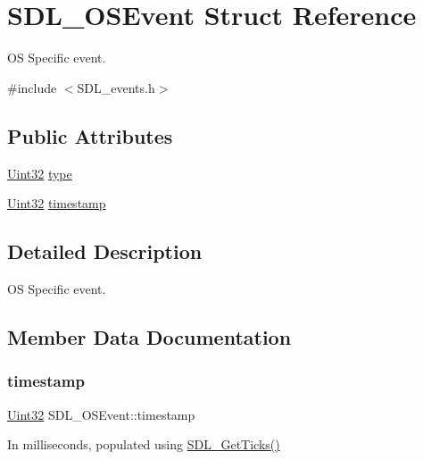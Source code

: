 \hypertarget{struct_s_d_l___o_s_event}{}\section{S\+D\+L\+\_\+\+O\+S\+Event Struct Reference}
\label{struct_s_d_l___o_s_event}


OS Specific event.  




{\ttfamily \#include $<$S\+D\+L\+\_\+events.\+h$>$}

\subsection*{Public Attributes}
\begin{DoxyCompactItemize}
\item 
\mbox{\hyperlink{_s_d_l__stdinc_8h_add440eff171ea5f55cb00c4a9ab8672d}{Uint32}} \mbox{\hyperlink{struct_s_d_l___o_s_event_a85a600619ebebc8db007fc757b3895a5}{type}}
\item 
\mbox{\hyperlink{_s_d_l__stdinc_8h_add440eff171ea5f55cb00c4a9ab8672d}{Uint32}} \mbox{\hyperlink{struct_s_d_l___o_s_event_a8b2480eefadad9f3f8c94f8e550b7fb0}{timestamp}}
\end{DoxyCompactItemize}


\subsection{Detailed Description}
OS Specific event. 

\subsection{Member Data Documentation}
\mbox{\label{struct_s_d_l___o_s_event_a8b2480eefadad9f3f8c94f8e550b7fb0}} 
\subsubsection{\texorpdfstring{timestamp}{timestamp}}
{\footnotesize\ttfamily \mbox{\hyperlink{_s_d_l__stdinc_8h_add440eff171ea5f55cb00c4a9ab8672d}{Uint32}} S\+D\+L\+\_\+\+O\+S\+Event\+::timestamp}

In milliseconds, populated using \mbox{\hyperlink{_s_d_l__timer_8h_a0b9bc71d6287e0ffafdc3419760fe2b3}{S\+D\+L\+\_\+\+Get\+Ticks()}} \mbox{\label{struct_s_d_l___o_s_event_a85a600619ebebc8db007fc757b3895a5}} 
